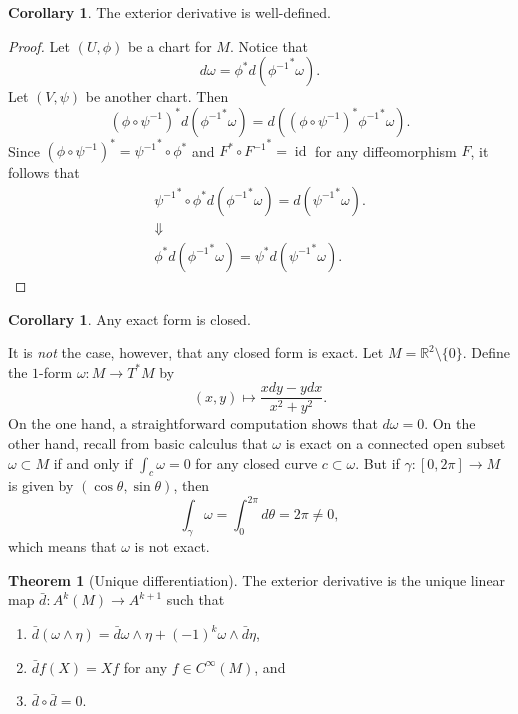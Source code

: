 \documentclass[10pt,letterpaper,cm]{nupset}
\theoremstyle{definition}
\theoremstyle{theorem}
\newtheorem{theorem}[definition]{Theorem}
\newtheorem{corollary}[definition]{Corollary}
\theoremstyle{remark}
\newcommand{\R}{\mathbb R}
\newcommand{\1}{\mathbf{1}}
\newcommand{\0}{\vec 0}
\DeclareMathOperator{\id}{id}
\begin{document}
\begin{corollary}
The exterior derivative is well-defined.
\end{corollary}
\begin{proof}
Let $(U, \phi)$ be a chart for $M$. Notice that $$d\omega = \phi^{\ast} d\left({\phi^{-1}}^{\ast}\omega\right).$$ Let $(V, \psi)$ be another chart. Then $$ \left(\phi \circ \psi^{-1}\right)^{\ast} d\left({\phi^{-1}}^{\ast} \omega\right) =  d\left( \left(\phi \circ \psi^{-1}\right)^{\ast}{\phi^{-1}}^{\ast} \omega\right).$$ Since $\left(\phi \circ \psi^{-1}\right)^{\ast} = {\psi^{-1}}^{\ast} \circ \phi^{\ast}$ and $F^{\ast} \circ {F^{-1}}^{\ast}= \id$ for any diffeomorphism $F$, 
it follows that 
\begin{gather*}
{\psi^{-1}}^{\ast} \circ \phi^{\ast}d\left({\phi^{-1}}^{\ast} \omega\right) = d\left({\psi^{-1}}^{\ast} \omega\right).
\\ \Downarrow
 \\ \phi^{\ast}d\left({\phi^{-1}}^{\ast} \omega\right)  = \psi^{\ast} d\left({\psi^{-1}}^{\ast} \omega\right).
 \end{gather*}
\end{proof}

\begin{corollary}
Any exact form is closed.
\end{corollary}

\smallskip


It is \emph{not} the case, however, that any closed form is exact. Let $M=  \R^2 \setminus \{0\}$. Define the $1$-form $\omega : M \to T^{\ast}M$ by $$(x, y) \mapsto \frac{xdy - y dx}{x^2 + y^2}.$$ On the one hand, a straightforward computation shows that $d \omega =0$. On the other hand, recall from basic calculus that $\omega$ is exact on a connected open subset $\omega \subset M$ if and only if $\int_c \omega =0$ for any closed curve $c \subset \omega$. But if $\gamma : [0, 2\pi] \to M$ is given by $\left(\cos \theta, \sin \theta\right)$, then  
\[\label{eqn:nexact}
 \int_{\gamma} \omega = \int_{0}^{2\pi} d\theta = 2\pi \ne 0 , \tag{$\dagger$}
\] which means that $\omega$ is not exact.


\begin{theorem}[Unique differentiation]
The exterior derivative is the unique linear map $\bar{d} : A^k(M) \to A^{k+1}$ such that
\begin{enumerate}[label=(\roman*)]
\item $\bar{d}( \omega \wedge \eta) = \bar{d} \omega \wedge \eta + ({-1})^k\omega \wedge \bar{d} \eta$,
\item $\bar{d}{f}(X)= X{f}$ for any $f\in C^{\infty}(M)$, and 
\item $\bar{d} \circ \bar{d} = 0$.
\end{enumerate}
\end{theorem}
\end{document}
